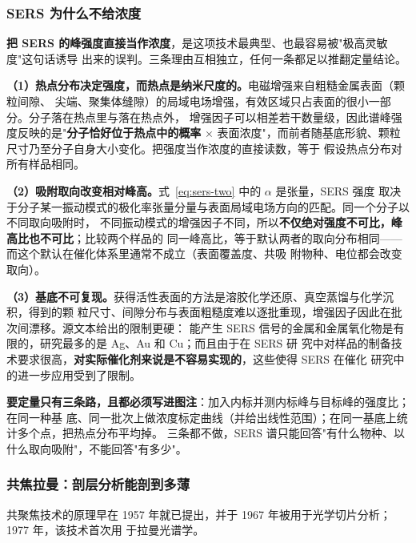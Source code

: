 \subsubsection{SERS 为什么不给浓度}
\label{sec:ch06b-sers-quant}

\begin{pitfall}
\textbf{把 SERS 的峰强度直接当作浓度}，是这项技术最典型、也最容易被"极高灵敏度"这句话诱导
出来的误判。三条理由互相独立，任何一条都足以推翻定量结论。

\textbf{（1）热点分布决定强度，而热点是纳米尺度的。}电磁增强来自粗糙金属表面（颗粒间隙、
尖端、聚集体缝隙）的局域电场增强，有效区域只占表面的很小一部分。分子落在热点里与落在热点外，
增强因子可以相差若干数量级，因此谱峰强度反映的是"\textbf{分子恰好位于热点中的概率} $\times$
表面浓度"，而前者随基底形貌、颗粒尺寸乃至分子自身大小变化。把强度当作浓度的直接读数，等于
假设热点分布对所有样品相同。

\textbf{（2）吸附取向改变相对峰高。}式~\eqref{eq:sers-two} 中的 $\alpha$ 是张量，SERS 强度
取决于分子某一振动模式的极化率张量分量与表面局域电场方向的匹配。同一个分子以不同取向吸附时，
不同振动模式的增强因子不同，所以\textbf{不仅绝对强度不可比，峰高比也不可比}；比较两个样品的
同一峰高比，等于默认两者的取向分布相同——而这个默认在催化体系里通常不成立（表面覆盖度、共吸
附物种、电位都会改变取向）。

\textbf{（3）基底不可复现。}获得活性表面的方法是溶胶化学还原、真空蒸馏与化学沉积，得到的颗
粒尺寸、间隙分布与表面粗糙度难以逐批重现，增强因子因此在批次间漂移。源文本给出的限制更硬：
能产生 SERS 信号的金属和金属氧化物是有限的，研究最多的是 Ag、Au 和 Cu；而且由于在 SERS 研
究中对样品的制备技术要求很高，\textbf{对实际催化剂来说是不容易实现的}，这些使得 SERS 在催化
研究中的进一步应用受到了限制。

\textbf{要定量只有三条路，且都必须写进图注}：加入内标并测内标峰与目标峰的强度比；在同一种基
底、同一批次上做浓度标定曲线（并给出线性范围）；在同一基底上统计多个点，把热点分布平均掉。
三条都不做，SERS 谱只能回答"有什么物种、以什么取向吸附"，不能回答"有多少"。
\end{pitfall}

\subsubsection{共焦拉曼：剖层分析能剖到多薄}
\label{sec:ch06b-confocal}

共聚焦技术的原理早在 1957 年就已提出，并于 1967 年被用于光学切片分析；1977 年，该技术首次用
于拉曼光谱学。

